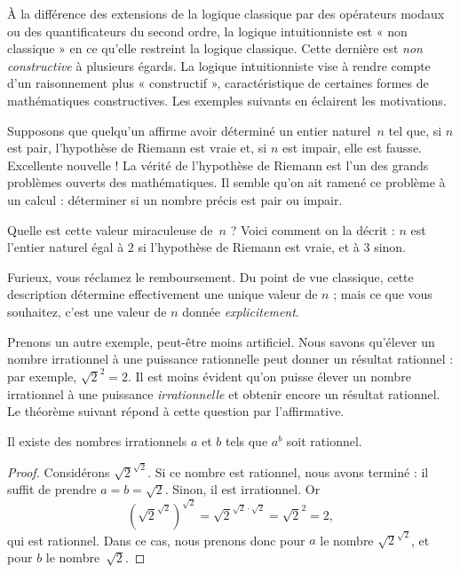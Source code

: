 \documentclass[../../../include/open-logic-section]{subfiles}
\begin{document}


À la différence des extensions de la logique classique par des opérateurs
modaux ou des quantificateurs du second ordre, la logique intuitionniste
est « non classique » en ce qu'elle restreint la logique classique.
Cette dernière est \emph{non constructive} à plusieurs égards. La
logique intuitionniste vise à rendre compte d'un raisonnement plus
« constructif », caractéristique de certaines formes de mathématiques
constructives. Les exemples suivants en éclairent les motivations.

Supposons que quelqu'un affirme avoir déterminé un entier naturel~$n$
tel que, si $n$ est pair, l'hypothèse de Riemann est vraie et, si $n$
est impair, elle est fausse. Excellente nouvelle !{} La vérité de
l'hypothèse de Riemann est l'un des grands problèmes ouverts des
mathématiques. Il semble qu'on ait ramené ce problème à un calcul :
déterminer si un nombre précis est pair ou impair.

Quelle est cette valeur miraculeuse de~$n$ ? Voici comment on la décrit :
$n$ est l'entier naturel égal à $2$ si l'hypothèse de Riemann est vraie,
et à $3$ sinon.

Furieux, vous réclamez le remboursement. Du point de vue classique,
cette description détermine effectivement une unique valeur de $n$ ;
mais ce que vous souhaitez, c'est une valeur de $n$ donnée
\emph{explicitement}.

Prenons un autre exemple, peut-être moins artificiel. Nous savons
qu'élever un nombre irrationnel à une puissance rationnelle peut donner
un résultat rationnel : par exemple, $\sqrt{2}^2 = 2$. Il est moins
évident qu'on puisse élever un nombre irrationnel à une puissance
\emph{irrationnelle} et obtenir encore un résultat rationnel. Le
théorème suivant répond à cette question par l'affirmative.

\begin{thm}
Il existe des nombres irrationnels $a$ et $b$ tels que $a^b$ soit rationnel.
\end{thm}

\begin{proof}
Considérons $\sqrt{2}^{\sqrt{2}}$. Si ce nombre est rationnel, nous
avons terminé : il suffit de prendre $a = b = \sqrt{2}$. Sinon,
il est irrationnel. Or
\[
(\sqrt{2}^{\sqrt{2}})^{\sqrt{2}} = \sqrt{2}^{\sqrt{2} \cdot
  \sqrt{2}} = \sqrt{2}^2 = 2,
\]
qui est rationnel. Dans ce cas, nous prenons donc pour $a$ le nombre
$\sqrt{2}^{\sqrt{2}}$, et pour $b$ le nombre~$\sqrt 2$.
\end{proof}
\end{document}
